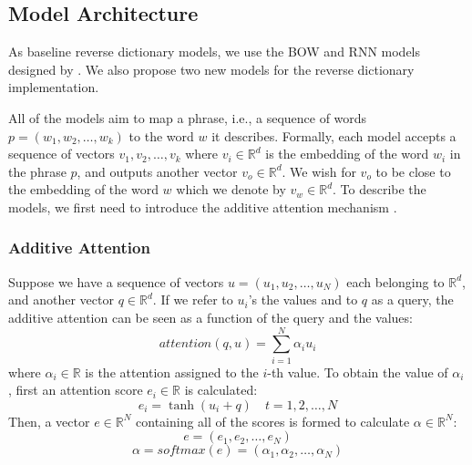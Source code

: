 \documentclass{article}
\begin{document}
\subsection{Model Architecture}
As baseline reverse dictionary models, we use the BOW and RNN models designed by \citet{hill2016learning}. We also propose two new models for the reverse dictionary implementation.

All of the models aim to map a phrase, i.e., a sequence of words $p=(w_1, w_2, \dots, w_k)$ to the word $w$ it describes. Formally, each model accepts a sequence of vectors $v_1, v_2, \dots, v_k$ where $v_i \in \mathbb{R}^{d}$ is the embedding of the word $w_i$ in the phrase $p$, and outputs another vector $v_o \in \mathbb{R}^d$. We wish for $v_o$ to be close to the embedding of the word $w$ which we denote by $v_w \in \mathbb{R}^{d}$. To describe the models, we first need to introduce the additive attention mechanism \citep{bahdanau2014neural}.
\subsubsection{Additive Attention}
Suppose we have a sequence of vectors $u=(u_1, u_2, \dots, u_N)$ each belonging to $\mathbb{R}^{d}$, and another vector $q\in\mathbb{R}^{d}$. If we refer to $u_i$'s the values and to $q$ as a query, the additive attention can be seen as a function of the query and the values:
\begin{equation}
attention(q,u)=\sum_{i=1}^{N} \alpha_i u_i
\end{equation}
where $\alpha_i \in \mathbb{R}$ is the attention assigned to the $i$-th value. To obtain the value of $\alpha_i$, first an attention score $e_i \in \mathbb{R}$ is calculated:
\begin{equation}
e_i = \tanh(u_i+q) \quad t=1,2,\dots,N
\end{equation}
Then, a vector $e\in\mathbb{R}^{N}$ containing all of the scores is formed to calculate $\alpha \in\mathbb{R}^{N}$:
\begin{equation}
e=(e_1,e_2,\dots,e_N)
\end{equation}
\begin{equation}
\alpha=softmax(e)=(\alpha_1,\alpha_2,\dots,\alpha_N)
\end{equation}
\end{document}
